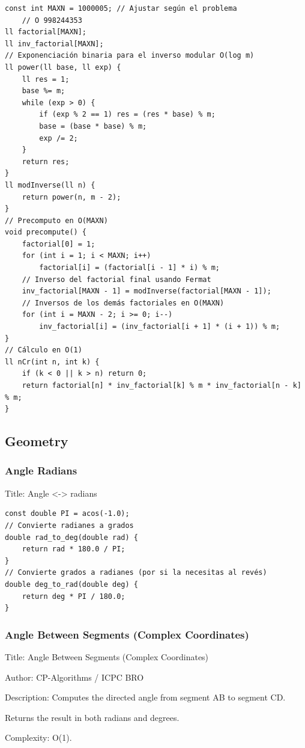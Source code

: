 \documentclass[10pt,landscape,twocolumn]{article}
\begin{document}
\begin{lstlisting}
const int MAXN = 1000005; // Ajustar según el problema
    // O 998244353
ll factorial[MAXN];
ll inv_factorial[MAXN];
// Exponenciación binaria para el inverso modular O(log m)
ll power(ll base, ll exp) {
    ll res = 1;
    base %= m;
    while (exp > 0) {
        if (exp % 2 == 1) res = (res * base) % m;
        base = (base * base) % m;
        exp /= 2;
    }
    return res;
}
ll modInverse(ll n) {
    return power(n, m - 2);
}
// Precomputo en O(MAXN)
void precompute() {
    factorial[0] = 1;
    for (int i = 1; i < MAXN; i++)
        factorial[i] = (factorial[i - 1] * i) % m;
    // Inverso del factorial final usando Fermat
    inv_factorial[MAXN - 1] = modInverse(factorial[MAXN - 1]);
    // Inversos de los demás factoriales en O(MAXN)
    for (int i = MAXN - 2; i >= 0; i--)
        inv_factorial[i] = (inv_factorial[i + 1] * (i + 1)) % m;
}
// Cálculo en O(1)
ll nCr(int n, int k) {
    if (k < 0 || k > n) return 0;
    return factorial[n] * inv_factorial[k] % m * inv_factorial[n - k] % m;
}
\end{lstlisting}

\subsection{Geometry}

\subsubsection{Angle Radians}
\begin{flushleft}
\footnotesize\ttfamily
\par\noindent Title: Angle \textless{}-\textgreater{} radians
\end{flushleft}

\begin{lstlisting}
const double PI = acos(-1.0);
// Convierte radianes a grados
double rad_to_deg(double rad) {
    return rad * 180.0 / PI;
}
// Convierte grados a radianes (por si la necesitas al revés)
double deg_to_rad(double deg) {
    return deg * PI / 180.0;
}
\end{lstlisting}

\subsubsection{Angle Between Segments (Complex Coordinates)}
\begin{flushleft}
\footnotesize\ttfamily
\par\noindent Title: Angle Between Segments (Complex Coordinates)
\par\noindent Author: CP-Algorithms / ICPC BRO
\par\noindent Description: Computes the directed angle from segment AB to segment CD.
\par\noindent Returns the result in both radians and degrees.
\par\noindent Complexity: O(1).
\end{flushleft}
\end{document}
